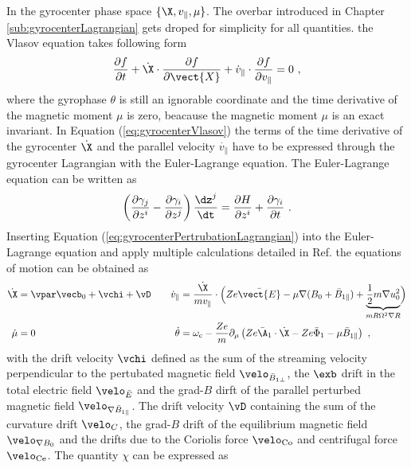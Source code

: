 In the gyrocenter phase space $\{\X, v_\parallel, \mu\}$. The overbar introduced in Chapter \ref{sub:gyrocenterLagrangian} gets droped for simplicity for all quantities. the Vlasov equation takes following form
\begin{gather}
	\frac{\partial f}{\partial t} + \dot{\X} \cdot \frac{\partial f}{\partial \vect{X}} + \dot{v}_\parallel \cdot \frac{\partial f}{\partial v_\parallel} = 0~,
	\label{eq:gyrocenterVlasov}
\end{gather}
where the gyrophase $\theta$ is still an ignorable coordinate and the time derivative of the magnetic moment $\mu$ is zero, beacause the magnetic moment $\mu$ is an exact invariant. In Equation (\ref{eq:gyrocenterVlasov}) the terms of the time derivative of the gyrocenter $\dot{\X}$ and the parallel velocity $\dot{v_\parallel}$ have to be expressed through the gyrocenter Lagrangian with the Euler-Lagrange equation. The Euler-Lagrange equation can be written as 
\begin{gather}
	\left(\frac{\partial \gamma_j}{\partial z^i} - \frac{\partial \gamma_i}{\partial z^j}\right) \frac{\dz^j}{\dt} = \frac{\partial H}{\partial z^i} + \frac{\partial \gamma_i}{\partial t}~.
	\label{eq:eulerLagrange}
\end{gather}
Inserting Equation (\ref{eq:gyrocenterPertrubationLagrangian}) into the Euler-Lagrange equation and apply multiple calculations detailed in Ref.  the equations of motion can be obtained as
\begin{gather}
	\begin{aligned}
		\dot{\X} &= \vpar\vecb_0 + \vchi + \vD &\quad \dot{v}_\parallel &= \frac{\dot{\X}}{mv_\parallel} \cdot \Bigl( Ze \bar{\vect{E}} -\mu\nabla (B_0 + \bar{B}_{1\parallel}) + \underbrace{\frac{1}{2} m \nabla u_0^2}_{mR \Omega^2 \nabla R} \Bigr) \\
		\dot{\mu} &= 0  &\quad \dot{\theta} &= \omega_\mathrm{c} - \frac{Ze}{m} \partial_\mu \left(Ze\bar{\A}_1 \cdot \dot{\X} - Ze\bar{\Phi}_1 - \mu\bar{B}_{1\parallel}\right)~,
	\end{aligned}
	\label{eq:motionEquation}
\end{gather}
with the drift velocity $\vchi$ defined as the sum of the streaming velocity perpendicular to the pertubated magnetic field $\velo_{\bar{B}_{1\perp}}$, the $\exb$ drift in the total electric field $\velo_{\bar{E}}$ and the grad-$B$ dirft of the parallel perturbed magnetic field $\velo_{\nabla \bar{B}_{1\parallel}}$. The drift velocity $\vD$ containing the sum of the curvature drift $\velo_C$, the grad-$B$ drift of the equilibrium magnetic field $\velo_{\nabla B_0}$ and the drifts due to the Coriolis force $\velo_\mathrm{Co}$ and centrifugal force $\velo_\mathrm{Ce}$. The quantity $\chi$ can be expressed as
